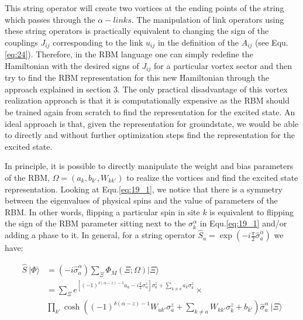 \documentclass{article}
\begin{document}
This string operator will create two vortices at the ending points of the string which passes through the $\alpha-links$. The manipulation of link operators using these string operators is practically equivalent to changing the sign of the couplings $J_{ij}$ corresponding to the link $u_{ij}$ in the definition of the $A_{ij}$ (see Equ.\hspace{0.2mm}\ref{eq:24}). Therefore, in the RBM language one can simply redefine the Hamiltonian with the desired signs of $J_{ij}$ for a particular vortex sector and then try to find the RBM representation for this new Hamiltonian through the approach explained in section 3. The only practical disadvantage of this vortex realization approach is that it is computationally expensive as the RBM should be trained again from scratch to find the representation for the excited state. An ideal approach is that, given the representation for groundstate, we would be able to directly and without further optimization steps find the representation for the excited state. 

In principle, it is possible to directly manipulate the weight and bias parameters of the RBM,  $\Omega=(a_{k},b_{k'},W_{kk'})$ to realize the vortices and find the excited state representation. Looking at Equ.\hspace{0.2mm}\ref{eq:19_1}, we notice that there is a symmetry between the eigenvalues of physical spins and the value of parameters of the RBM. In other words, flipping a particular spin in site $k$ is equivalent to flipping the sign of the RBM parameter sitting next to the $\sigma^{\alpha}_k$ in Equ.\hspace{0.2mm}\ref{eq:19_1} and/or adding a phase to it. In general, for a string operator $\hat{S}_a = \exp{(-i\frac{\pi}{2}\hat{\sigma}^{\alpha}_a)}$ we have:

\begin{equation}\label{eq:29_1}
	\begin{aligned}
		\hat{S}~|\Phi\rangle &= (-i\hat{\sigma}^{\alpha}_a)\sum_{\Xi}\Phi_{M}(\Xi;\Omega)|\Xi\rangle\\
		&= \sum_{\Xi} e^{[(-1)^{\delta(\alpha-z)-1} a_a -i\frac{\pi}{2}\sigma^{z}_a]\sigma^{z}_a + \sum_{k\neq a} a_k \sigma_k^z} \times \\ &\prod_{k'} \cosh \left((-1)^{\delta(\alpha-z)-1} W_{ak'} \sigma_a^z + \sum_{k\neq a} W_{kk'} \sigma_k^z + b_{k'} \right) \hat{\sigma}^{\alpha}_a~|\Xi\rangle
	\end{aligned}
\end{equation}
\end{document}
